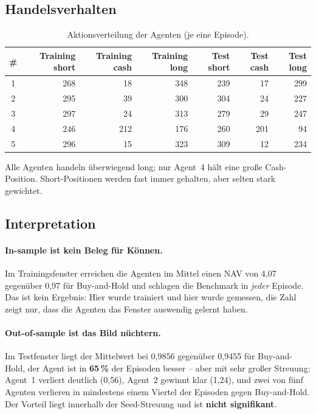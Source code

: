 \subsection{Handelsverhalten}

\begin{table}[H]
  \centering
  \caption{Aktionsverteilung der Agenten (je eine Episode).}
  \label{tab:aktionen}
  \begin{tabular}{crrr|rrr}
    \toprule
    \# & Training short & Training cash & Training long & Test short & Test cash & Test long\\
    \midrule
    1 & 268 & 18  & 348 & 239 & 17  & 299\\
    2 & 295 & 39  & 300 & 304 & 24  & 227\\
    3 & 297 & 24  & 313 & 279 & 29  & 247\\
    4 & 246 & 212 & 176 & 260 & 201 & 94\\
    5 & 296 & 15  & 323 & 309 & 12  & 234\\
    \bottomrule
  \end{tabular}
\end{table}

Alle Agenten handeln überwiegend long; nur Agent~4 hält eine große Cash-Position. Short-Positionen
werden fast immer gehalten, aber selten stark gewichtet.

\subsection{Interpretation}

\paragraph{In-sample ist kein Beleg für Können.} Im Trainingsfenster erreichen die Agenten im
Mittel einen NAV von 4,07 gegenüber 0,97 für Buy-and-Hold und schlagen die Benchmark in
\emph{jeder} Episode. Das ist kein Ergebnis: Hier wurde trainiert und hier wurde gemessen, die
Zahl zeigt nur, dass die Agenten das Fenster auswendig gelernt haben.

\paragraph{Out-of-sample ist das Bild nüchtern.} Im Testfenster liegt der Mittelwert bei
0,9856 gegenüber 0,9455 für Buy-and-Hold, der Agent ist in \textbf{65\,\%} der Episoden
besser -- aber mit sehr großer Streuung: Agent~1 verliert deutlich (0,56), Agent~2 gewinnt
klar (1,24), und zwei von fünf Agenten verlieren in mindestens einem Viertel der Episoden
gegen Buy-and-Hold. Der Vorteil liegt innerhalb der Seed-Streuung und ist
\textbf{nicht signifikant}.

